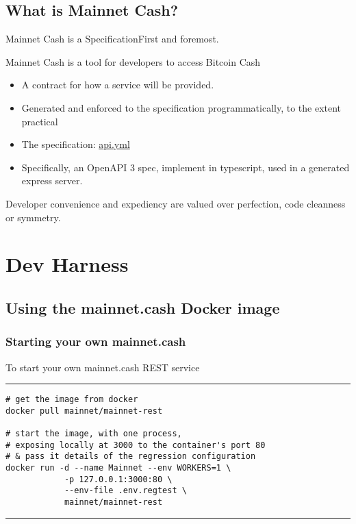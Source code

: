 \documentclass{beamer}
\begin{document}
\subsection[Mainnet Cash]{What is Mainnet Cash?}

\begin{frame}{Mainnet Cash is a Specification}{First and foremost.}

  Mainnet Cash is a tool for developers to access Bitcoin Cash
  \begin{itemize}
  \item
    A contract for how a service will be provided.
  \item
    Generated and enforced to the specification programmatically, to the extent practical
  \item
    The specification: \href{https://rest-unstable.mainnet.cash/api-docs/}{api.yml}
  \item
    Specifically, an OpenAPI 3 spec, implement in typescript, used in a generated express server. 
  \end{itemize}
  Developer convenience and expediency are valued over perfection, code cleanness or symmetry.
\end{frame}

\section{Dev Harness}

\subsection[Docker image]{Using the mainnet.cash Docker image}

\begin{frame}[fragile]
    \frametitle{Starting your own mainnet.cash}
      To start your own mainnet.cash REST service
    \rule{\textwidth}{0.9pt}
    \tiny
    \begin{verbatim}
# get the image from docker
docker pull mainnet/mainnet-rest

# start the image, with one process, 
# exposing locally at 3000 to the container's port 80
# & pass it details of the regression configuration
docker run -d --name Mainnet --env WORKERS=1 \ 
            -p 127.0.0.1:3000:80 \ 
            --env-file .env.regtest \
            mainnet/mainnet-rest
    \end{verbatim}
\rule{\textwidth}{0.9pt}

\end{frame}
\end{document}
